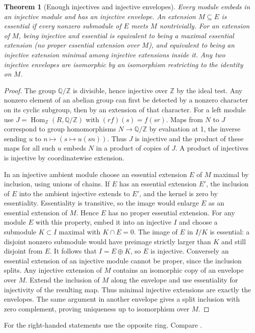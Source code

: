 \documentclass[11pt,oneside,openany]{book}
\newtheorem{theorem}{Theorem}[chapter]
\theoremstyle{definition}
\theoremstyle{remark}
\begin{document}
\begin{theorem}[Enough injectives and injective envelopes]
\label{p103:ALG-03-C02-S03}
Every module embeds in an injective module and has an injective
envelope. An extension \(M\subseteq E\) is essential if every
nonzero submodule of \(E\) meets \(M\) nontrivially. For an
extension of \(M\), being injective and essential is equivalent to
being a maximal essential extension (no proper essential extension
over \(M\)), and equivalent to being an injective extension
minimal among injective extensions inside it. Any two injective
envelopes are isomorphic by an isomorphism restricting to the
identity on \(M\).
\end{theorem}
\begin{proof}
The group \(\mathbb Q/\mathbb Z\) is divisible, hence injective over
\(\mathbb Z\) by the ideal test. Any nonzero element of an abelian
group can first be detected by a nonzero character on its cyclic
subgroup, then by an extension of that character. For a left
module use \(J=\operatorname{Hom}_{\mathbb Z}(R,\mathbb Q/\mathbb Z)\)
with \((rf)(s)=f(sr)\). Maps from \(N\) to \(J\) correspond to
group homomorphisms \(N\to\mathbb Q/\mathbb Z\) by evaluation at
1, the inverse sending \(u\) to \(n\mapsto(s\mapsto u(sn))\).
Thus \(J\) is injective and the product of these maps for all such
\(u\) embeds \(N\) in a product of copies of \(J\). A product of
injectives is injective by coordinatewise extension.

In an injective ambient module choose an essential extension \(E\)
of \(M\) maximal by inclusion, using unions of chains. If \(E\)
has an essential extension \(E'\), the inclusion of \(E\) into
the ambient injective extends to \(E'\), and the kernel is zero
by essentiality. Essentiality is transitive, so the image would
enlarge \(E\) as an essential extension of \(M\). Hence \(E\)
has no proper essential extension. For any module \(E\) with
this property, embed it into an injective \(I\) and choose a
submodule \(K\subset I\) maximal with \(K\cap E=0\). The image of
\(E\) in \(I/K\) is essential: a disjoint nonzero submodule would
have preimage strictly larger than \(K\) and still disjoint from
\(E\). It follows that \(I=E\oplus K\), so \(E\) is injective.
Conversely an essential extension of an injective module cannot
be proper, since the inclusion splits. Any injective extension
of \(M\) contains an isomorphic copy of an envelope over \(M\).
Extend the inclusion of \(M\) along the envelope and use
essentiality for injectivity of the resulting map. Thus minimal
injective extensions are exactly the envelopes. The same argument
in another envelope gives a split inclusion with zero complement,
proving uniqueness up to isomorphism over \(M\).
\end{proof}
For the right-handed statements use the opposite ring.
Compare \cite[Sections 3C--3D]{lam}.
\end{document}
